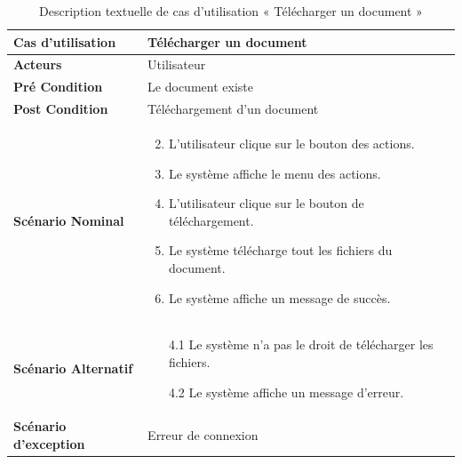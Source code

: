 
\begin{longtable}{|p{5cm}|p{10cm}|}
  \caption{Description textuelle de cas d'utilisation « Télécharger un document »} \label{tab:DescriptionTextuelleDeCasDUtilisationTéléchargerUnDocument} \\
\hline
\textbf{Cas d'utilisation}& Télécharger un document\\
\hline
\textbf{Acteurs}&Utilisateur\\
\hline
\textbf{Pré Condition}&Le document existe\\
\hline
\textbf{Post Condition}&Téléchargement d'un document\\
\hline
\textbf{Scénario Nominal}&
\vspace{-\baselineskip}
\begin{enumerate}
    \setcounter{enumi}{1}
    \item L'utilisateur clique sur le bouton des actions.
    \item Le système affiche le menu des actions.
    \item L'utilisateur clique sur le bouton de téléchargement.
    \item Le système télécharge tout les fichiers du document.
    \item Le système affiche un message de succès.
\end{enumerate}\\
\hline
\textbf{Scénario Alternatif}&
\vspace{-\baselineskip}
\begin{enumerate}
  \item [4.1] Le système n'a pas le droit de télécharger les fichiers.
  \item [4.2] Le système affiche un message d'erreur.
\end{enumerate}\\
\hline
\textbf{Scénario d'exception}&Erreur de connexion\\
\hline

\end{longtable}



